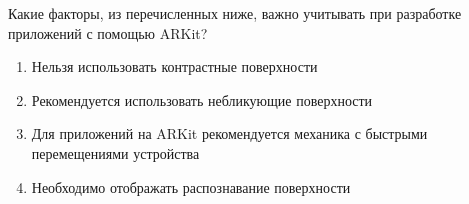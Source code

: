 
Какие факторы, из перечисленных ниже, важно учитывать при разработке приложений с помощью ARKit?

\begin{enumerate}
    \item Нельзя использовать контрастные поверхности
    \item Рекомендуется использовать небликующие поверхности
    \item Для приложений на ARKit рекомендуется механика с быстрыми перемещениями устройства
    \item Необходимо отображать распознавание поверхности
\end{enumerate}